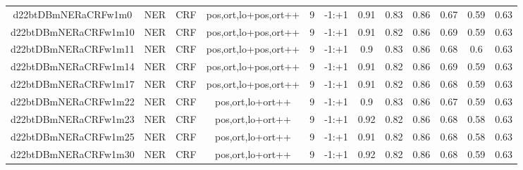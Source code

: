 \documentclass[a4paper]{article}
\begin{document}
\begin{landscape}
\begin{center}
\begin{tabular}{ |c|c|c|c|c|c|c|c|c|c|c|c|}
 	
 		
 		\small{ d22btDBmNERaCRFw1m0 } & NER & CRF & pos,ort,lo+pos,ort++  &  9 &  -1:+1  &  0.91 & 0.83 & 0.86  &  0.67 & 0.59 & 0.63 \\
 		

 	
 
 	
 		
 		\small{ d22btDBmNERaCRFw1m10 } & NER & CRF & pos,ort,lo+pos,ort++  &  9 &  -1:+1  &  0.91 & 0.82 & 0.86  &  0.69 & 0.59 & 0.63 \\
 		

 	
 
 	
 		
 		\small{ d22btDBmNERaCRFw1m11 } & NER & CRF & pos,ort,lo+pos,ort++  &  9 &  -1:+1  &  0.9 & 0.83 & 0.86  &  0.68 & 0.6 & 0.63 \\
 		

 	
 
 	
 		
 		\small{ d22btDBmNERaCRFw1m14 } & NER & CRF & pos,ort,lo+pos,ort++  &  9 &  -1:+1  &  0.91 & 0.82 & 0.86  &  0.69 & 0.59 & 0.63 \\
 		

 	
 
 	
 		
 		\small{ d22btDBmNERaCRFw1m17 } & NER & CRF & pos,ort,lo+pos,ort++  &  9 &  -1:+1  &  0.91 & 0.82 & 0.86  &  0.68 & 0.59 & 0.63 \\
 		

 	
 
 	
 		
 		\small{ d22btDBmNERaCRFw1m22 } & NER & CRF & pos,ort,lo+ort++  &  9 &  -1:+1  &  0.9 & 0.83 & 0.86  &  0.67 & 0.59 & 0.63 \\
 		

 	
 
 	
 		
 		\small{ d22btDBmNERaCRFw1m23 } & NER & CRF & pos,ort,lo+ort++  &  9 &  -1:+1  &  0.92 & 0.82 & 0.86  &  0.68 & 0.58 & 0.63 \\
 		

 	
 
 	
 		
 		\small{ d22btDBmNERaCRFw1m25 } & NER & CRF & pos,ort,lo+ort++  &  9 &  -1:+1  &  0.91 & 0.82 & 0.86  &  0.68 & 0.58 & 0.63 \\
 		

 	
 
 	
 		
 		\small{ d22btDBmNERaCRFw1m30 } & NER & CRF & pos,ort,lo+ort++  &  9 &  -1:+1  &  0.92 & 0.82 & 0.86  &  0.68 & 0.59 & 0.63 \\
 		


\end{tabular}
\end{center}
\end{landscape}
\end{document}
